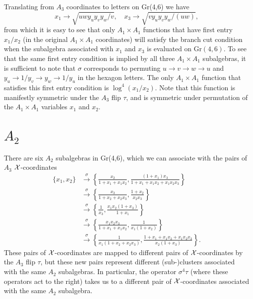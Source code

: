 \documentclass[12pt]{article}
\begin{document}
Translating from $A_3$ coordinates to letters on Gr(4,6) we have
$$x_1 \rightarrow \sqrt{u w y_u y_v y_w/v}, \quad x_3 \rightarrow \sqrt{v y_u y_v y_w/(u w)},$$
from which it is easy to see that only $A_1 \times A_1$ functions that have first entry $x_1/x_2$ (in the original $A_1 \times A_1$ coordinates) will satisfy the branch cut condition when the subalgebra associated with $x_1$ and $x_3$ is evaluated on $\text{Gr}(4,6)$. To see that the same first entry condition is implied by all three $A_1 \times A_1$ subalgebras, it is sufficient to note that $\sigma$ corresponds to permuting $u \rightarrow v \rightarrow w \rightarrow u$ and $y_u \rightarrow 1/y_v \rightarrow y_w \rightarrow 1/y_u$ in the hexagon letters. The only $A_1 \times A_1$ function that satisfies this first entry condition is $\log^4(x_1/x_2)$. Note that this function is manifestly symmetric under the $A_3$ flip $\tau$, and is symmetric under permutation of the $A_1 \times A_1$ variables $x_1$ and $x_2$.  

\section*{$A_2$}
There are six $A_2$ subalgebras in Gr(4,6), which we can associate with the pairs of $A_3$ ${\cal X}$-coordinates 
\begin{align*}
\{ x_1, x_2 \} &\xrightarrow{\sigma} \left \{ \frac{x_2}{1 + x_1 + x_1 x_2}, \frac{(1 + x_1) x_3}{1 + x_1 + x_1 x_2 + x_1 x_2 x_3} \right \} \\
&\xrightarrow{\sigma} \left \{ \frac{x_3}{1 + x_2 + x_2 x_3}, \frac{1 + x_2}{x_2 x_3} \right \}  \\
&\xrightarrow{\sigma} \left \{ \frac{1}{x_3}, \frac{x_1 x_2 (1 + x_3)}{1 + x_1} \right \} \\
&\xrightarrow{\sigma} \left\{ \frac{x_1 x_2 x_3}{1 + x_1 + x_1 x_2}, \frac{1}{x_1 (1 + x_2)} \right \} \\ &\xrightarrow{\sigma} \left \{ \frac{1}{x_1 (1 + x_2 + x_2 x_3)}, \frac{1 + x_1 + x_1 x_2 + x_1 x_2 x_3}{x_2 (1 + x_3)} \right \}.
\end{align*}
These pairs of ${\cal X}$-coordinates are mapped to different pairs of ${\cal X}$-coordinates by the $A_3$ flip $\tau$, but these new pairs represent different (sub-)clusters associated with the same $A_2$ subalgebras. In particular, the operator $\sigma^4 \tau$ (where these operators act to the right) takes us to a different pair of ${\cal X}$-coordinates associated with the same $A_2$ subalgebra.
\end{document}
